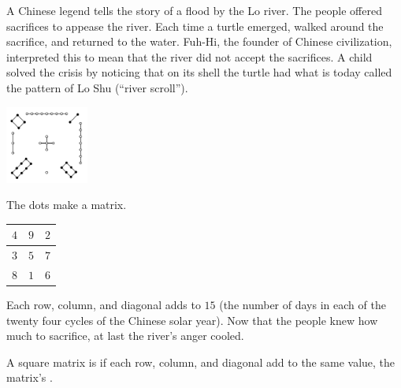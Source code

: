 A Chinese legend tells the story of a  
flood by the Lo river.
The people offered sacrifices to appease the river.
Each time a turtle emerged, 
walked around the sacrifice, and returned to the water.
Fuh-Hi, %
the founder of Chinese civilization,
interpreted this to mean that
the river did not accept the sacrifices.  
A child solved the crisis by noticing 
that on its shell the turtle had what is today
called the pattern of Lo Shu (``river scroll'').
\begin{center}
  \includegraphics[height=1in]{LoShu.png}
\end{center}
The dots make a matrix.
\begin{center}
  \begin{tabular}{|c|c|c|}
    \hline
      $4$  &$9$  &$2$  \\ \hline
      $3$  &$5$  &$7$  \\ \hline
      $8$  &$1$  &$6$  \\ \hline    
  \end{tabular}
\end{center}
Each row, column, 
and diagonal adds to $15$
(the number of days in each of the twenty four cycles of the 
Chinese solar year).
Now that the people knew how much to sacrifice, at last the river's anger cooled.

A square matrix is 
if each row, column, and diagonal add to the same
value, the matrix's .

